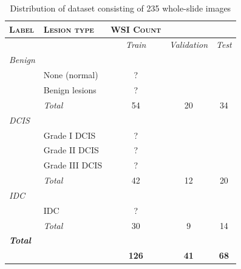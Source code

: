 \documentclass[journal]{IEEEtran}
\begin{document}
\begin{table}[!t]
\renewcommand{\arraystretch}{1.05}
\caption{Distribution of dataset consisting of 235 whole-slide images}
\label{table_dataset}
\centering
\begin{tabular}{|llccc|}
\hline
\textsc{Label}&\textsc{Lesion type}&\hspace{-0.4cm}\textsc{WSI Count}&&\\
\hline
&&\textit{Train}&\hspace{-0.24cm}\textit{Validation}&\textit{Test}\\
\textit{Benign}&&&&\\
&None (normal)& ?&&\\
&Benign lesions& ? &&\\
&\textit{Total}& 54&20&34\\

\textit{DCIS}&&&&\\
&Grade I DCIS&  ?&&\\
&Grade II DCIS& ?&&\\
&Grade III DCIS& ?&&\\
&\textit{Total}& 42&12&20\\
\textit{IDC}&&&&\\
&IDC& ?&&\\
&\textit{Total}& 30&9&14\\


\textit{\textbf{Total}}&&&&\\
&&\textbf{126}&\textbf{41}&\textbf{68}\\
\hline
\end{tabular}
\end{table}
\end{document}
